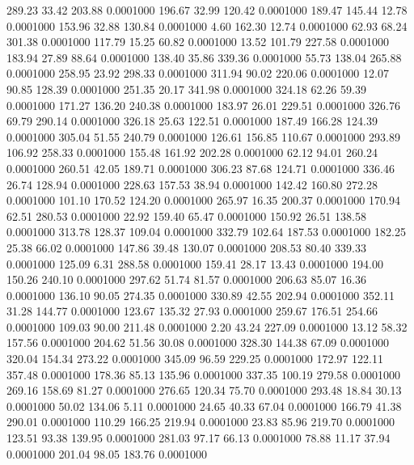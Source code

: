  289.23   33.42  203.88   0.0001000
 196.67   32.99  120.42   0.0001000
 189.47  145.44   12.78   0.0001000
 153.96   32.88  130.84   0.0001000
   4.60  162.30   12.74   0.0001000
  62.93   68.24  301.38   0.0001000
 117.79   15.25   60.82   0.0001000
  13.52  101.79  227.58   0.0001000
 183.94   27.89   88.64   0.0001000
 138.40   35.86  339.36   0.0001000
  55.73  138.04  265.88   0.0001000
 258.95   23.92  298.33   0.0001000
 311.94   90.02  220.06   0.0001000
  12.07   90.85  128.39   0.0001000
 251.35   20.17  341.98   0.0001000
 324.18   62.26   59.39   0.0001000
 171.27  136.20  240.38   0.0001000
 183.97   26.01  229.51   0.0001000
 326.76   69.79  290.14   0.0001000
 326.18   25.63  122.51   0.0001000
 187.49  166.28  124.39   0.0001000
 305.04   51.55  240.79   0.0001000
 126.61  156.85  110.67   0.0001000
 293.89  106.92  258.33   0.0001000
 155.48  161.92  202.28   0.0001000
  62.12   94.01  260.24   0.0001000
 260.51   42.05  189.71   0.0001000
 306.23   87.68  124.71   0.0001000
 336.46   26.74  128.94   0.0001000
 228.63  157.53   38.94   0.0001000
 142.42  160.80  272.28   0.0001000
 101.10  170.52  124.20   0.0001000
 265.97   16.35  200.37   0.0001000
 170.94   62.51  280.53   0.0001000
  22.92  159.40   65.47   0.0001000
 150.92   26.51  138.58   0.0001000
 313.78  128.37  109.04   0.0001000
 332.79  102.64  187.53   0.0001000
 182.25   25.38   66.02   0.0001000
 147.86   39.48  130.07   0.0001000
 208.53   80.40  339.33   0.0001000
 125.09    6.31  288.58   0.0001000
 159.41   28.17   13.43   0.0001000
 194.00  150.26  240.10   0.0001000
 297.62   51.74   81.57   0.0001000
 206.63   85.07   16.36   0.0001000
 136.10   90.05  274.35   0.0001000
 330.89   42.55  202.94   0.0001000
 352.11   31.28  144.77   0.0001000
 123.67  135.32   27.93   0.0001000
 259.67  176.51  254.66   0.0001000
 109.03   90.00  211.48   0.0001000
   2.20   43.24  227.09   0.0001000
  13.12   58.32  157.56   0.0001000
 204.62   51.56   30.08   0.0001000
 328.30  144.38   67.09   0.0001000
 320.04  154.34  273.22   0.0001000
 345.09   96.59  229.25   0.0001000
 172.97  122.11  357.48   0.0001000
 178.36   85.13  135.96   0.0001000
 337.35  100.19  279.58   0.0001000
 269.16  158.69   81.27   0.0001000
 276.65  120.34   75.70   0.0001000
 293.48   18.84   30.13   0.0001000
  50.02  134.06    5.11   0.0001000
  24.65   40.33   67.04   0.0001000
 166.79   41.38  290.01   0.0001000
 110.29  166.25  219.94   0.0001000
  23.83   85.96  219.70   0.0001000
 123.51   93.38  139.95   0.0001000
 281.03   97.17   66.13   0.0001000
  78.88   11.17   37.94   0.0001000
 201.04   98.05  183.76   0.0001000
